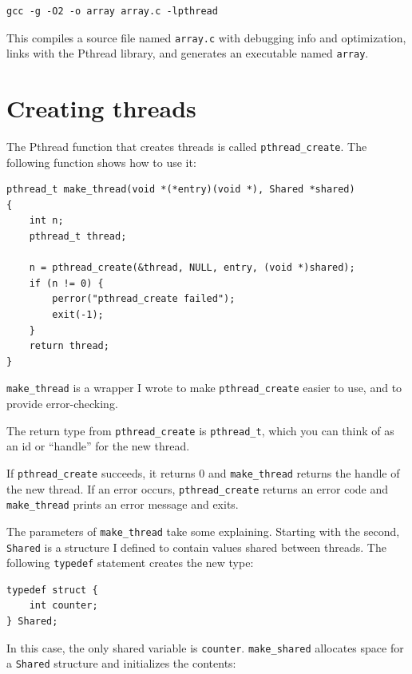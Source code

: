 \documentclass[12pt]{book}
\begin{document}
{\begin{verbatim}
gcc -g -O2 -o array array.c -lpthread
\end{verbatim}

This compiles a source file named {\tt array.c} with debugging info
and optimization, links with the Pthread library, and generates an
executable named {\tt array}.


\section{Creating threads}

The Pthread function that creates threads is called \verb"pthread_create".
The following function shows how to use it:

\begin{verbatim}
pthread_t make_thread(void *(*entry)(void *), Shared *shared)
{
    int n;
    pthread_t thread;

    n = pthread_create(&thread, NULL, entry, (void *)shared);
    if (n != 0) {
        perror("pthread_create failed");
        exit(-1);
    }
    return thread;
}
\end{verbatim}

\verb"make_thread" is a wrapper I wrote to make
\verb"pthread_create" easier to use, and to provide error-checking.


The return type from \verb"pthread_create" is \verb"pthread_t",
which you can think of as an id or ``handle'' for the new thread.  

If {\tt pthread\_create} succeeds, it returns 0 and \verb"make_thread"
returns the handle of the new thread.
If an error occurs, {\tt pthread\_create} 
returns an error code and \verb"make_thread" prints an error message
and exits.

The parameters of \verb"make_thread" take some
explaining.  Starting with the second, {\tt Shared}
is a structure I defined to contain values shared between threads.
The following {\tt typedef} statement creates the new type:

\begin{verbatim}
typedef struct {
    int counter;
} Shared;
\end{verbatim}

In this case, the only shared variable is {\tt counter}.
{\tt make\_shared} allocates
space for a {\tt Shared} structure and initializes the contents:

}
\end{document}
